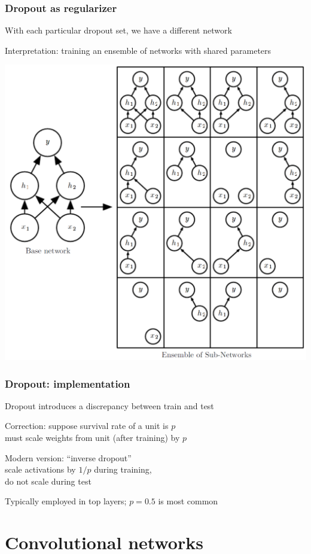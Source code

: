 \documentclass[xcolor=dvipsnames]{beamer}
\begin{document}
\begin{frame}
  \frametitle{Dropout as regularizer}
  \bi
\item With each particular dropout set, we have a different network
\item Interpretation: training an ensemble of networks with shared
  parameters

\includegraphics[width=.55\textwidth]{gcb-dropout-ensemble} \raisebox{3em}{[Goodfellow et al.]}
\ei
\end{frame}

\begin{frame}
  \frametitle{Dropout: implementation}
  \bi
\item Dropout introduces a discrepancy between train and test
\item Correction: suppose survival rate of a unit is $p$\\
must scale weights from unit (after training) by $p$
\item Modern version: ``inverse dropout''\\
scale activations by $1/p$ during training,\\
do not scale during test
\item Typically employed in top layers; $p=0.5$ is most common
\ei
\end{frame}

\section{Convolutional networks}
\end{document}
